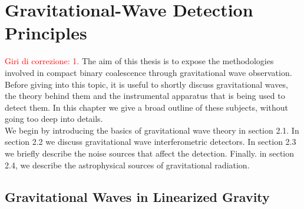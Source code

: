 \documentclass[binding=0.6cm, LaM]{sapthesis}
\newcommand{\fpg}[1]{\textcolor{red}{#1} }
\begin{document}
\chapter{Gravitational-Wave Detection Principles}
\label{ch:GWDetectionPrinciples}
\fpg{Giri di correzione: 1.}%
	The aim of this thesis is to expose the methodologies involved 
	in compact binary coalescence through gravitational wave observation. 
	Before giving into this topic, it is useful to shortly discuss gravitational waves, 
	the theory behind them and the instrumental apparatus that is being used to detect them. 
	In this chapter we give a broad outline of these subjects, 
	without going too deep into details. \\
	We begin by introducing the basics of gravitational wave theory in section 2.1. 
	In section 2.2 we discuss gravitational wave interferometric detectors. 
	In section 2.3 we briefly describe the noise sources that affect the detection. 
	Finally. in section 2.4, we describe the astrophysical sources of gravitational radiation.

\section{Gravitational Waves in Linearized Gravity}
\end{document}
